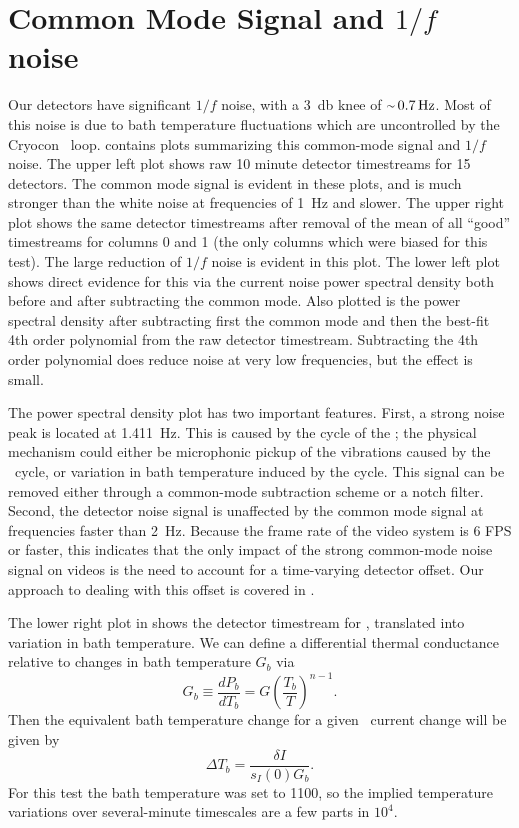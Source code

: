 \section{Common Mode Signal and $1/f$ noise} \label{sec:ch6-common}


Our detectors have significant $1/f$ noise, with a \SI{3}{\decibel} knee of $\abt{\SI{0.7}{\hertz}}$.
Most of this noise is due to bath temperature fluctuations which are uncontrolled by the Cryocon \PID\ loop.
 contains plots summarizing this common-mode signal and $1/f$ noise.
The upper left plot shows raw 10 minute detector timestreams for 15 detectors.
The common mode signal is evident in these plots, and is much stronger than the white noise at frequencies of \SI{1}{\Hz} and slower.
The upper right plot shows the same detector timestreams after removal of the mean of all ``good'' timestreams for columns 0 and 1 (the only columns which were biased for this test).
The large reduction of $1/f$ noise is evident in this plot.
The lower left plot shows direct evidence for this via the current noise power spectral density both before and after subtracting the common mode.
Also plotted is the power spectral density after subtracting first the common mode and then the best-fit 4th order polynomial from the raw detector timestream.
Subtracting the 4th order polynomial does reduce noise at very low frequencies, but the effect is small.

The power spectral density plot has two important features.
First, a strong noise peak is located at \SI{1.411}{\Hz}.
This is caused by the  cycle of the \PTC; the physical mechanism could either be microphonic pickup of the vibrations caused by the \PTC\ cycle, or variation in bath temperature induced by the cycle.
This signal can be removed either through a common-mode subtraction scheme or a notch filter.
Second, the detector noise signal is unaffected by the common mode signal at frequencies faster than \SI{2}{\Hz}.
Because the frame rate of the video system is 6 FPS or faster, this indicates that the only impact of the strong common-mode noise signal on videos is the need to account for a time-varying detector offset.
Our approach to dealing with this offset is covered in .

The lower right plot in  shows the detector timestream for , translated into variation in bath temperature.
We can define a differential thermal conductance relative to changes in bath temperature $G_b$ via
\begin{equation}
  G_b \equiv \frac{dP_b}{d T_b} = G \left( \frac{T_b}{T} \right)^{n-1}.
\end{equation}
Then the equivalent bath temperature change for a given \TES\ current change will be given by
\begin{equation}
  \Delta T_b = \frac{\delta I}{s_I(0) G_b}.
\end{equation}
For this test the bath temperature was set to \SI{1100}{\mK}, so the implied temperature variations over several-minute timescales are a few parts in $10^{4}$.

